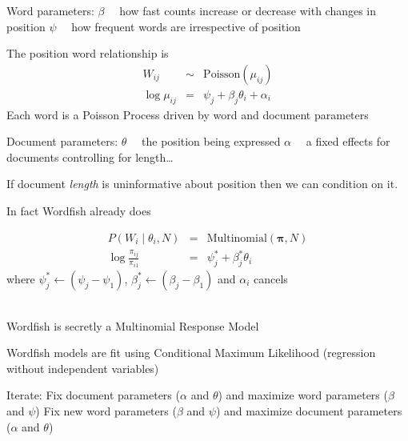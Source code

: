 \documentclass{mediumfoils}
\begin{document}
Word parameters:
\ita
\itm $\beta$~~ how fast counts increase or decrease with changes in position
\itm $\psi$~~ how frequent words are irrespective of position
\itz



The position word relationship is
\begin{eqnarray*}
W_{ij} &\sim& \text{Poisson}(\mu_{ij})\\
\log \mu_{ij} &=& \psi_{j} + \beta_{j}\theta_{i} +  \alpha_{i}
\end{eqnarray*}
Each word is a Poisson Process driven by word and document parameters

Document parameters:
\ita
\itm $\theta$~~ the position being expressed
\itm $\alpha$~~ a fixed effects for documents controlling for length\ldots
\itz


If document \textit{length} is uninformative about position then we can condition on it. 

In fact Wordfish already does

\begin{eqnarray*}
P(W_{i} \mid \theta_{i}, N) &=& \text{Multinomial}(\boldsymbol{\pi}, N)\\
\log \frac{\pi_{ij}}{\pi_{i1}} &=& \psi^{*}_{j} + \beta^{*}_{j}\theta_{i}
\end{eqnarray*}
where $\psi^{*}_{j} \leftarrow (\psi_{j}-\psi_{1})$, $\beta^{*}_{j} \leftarrow (\beta_{j}-\beta_{1})$ and $\alpha_{i}$ cancels

~\\
Wordfish is secretly a Multinomial Response Model

%


Wordfish models are fit using Conditional Maximum Likelihood (regression without independent variables)

Iterate:
\ita
\itm Fix document parameters ($\alpha$ and $\theta$) and maximize word parameters ($\beta$ and $\psi$)
\itm Fix new word parameters ($\beta$ and $\psi$) and maximize document parameters ($\alpha$ and $\theta$)
\itz
\end{document}
